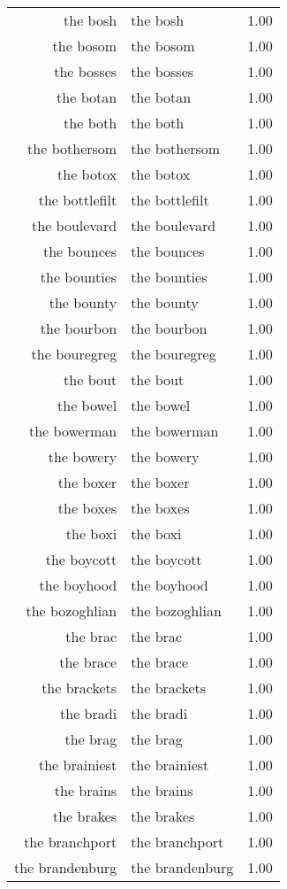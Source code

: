 \begin{table}[ht]
\begin{tabular}{rlr}
  the bosh & the bosh & 1.00 \\ 
  the bosom & the bosom & 1.00 \\ 
  the bosses & the bosses & 1.00 \\ 
  the botan & the botan & 1.00 \\ 
  the both & the both & 1.00 \\ 
  the bothersom & the bothersom & 1.00 \\ 
  the botox & the botox & 1.00 \\ 
  the bottlefilt & the bottlefilt & 1.00 \\ 
  the boulevard & the boulevard & 1.00 \\ 
  the bounces & the bounces & 1.00 \\ 
  the bounties & the bounties & 1.00 \\ 
  the bounty & the bounty & 1.00 \\ 
  the bourbon & the bourbon & 1.00 \\ 
  the bouregreg & the bouregreg & 1.00 \\ 
  the bout & the bout & 1.00 \\ 
  the bowel & the bowel & 1.00 \\ 
  the bowerman & the bowerman & 1.00 \\ 
  the bowery & the bowery & 1.00 \\ 
  the boxer & the boxer & 1.00 \\ 
  the boxes & the boxes & 1.00 \\ 
  the boxi & the boxi & 1.00 \\ 
  the boycott & the boycott & 1.00 \\ 
  the boyhood & the boyhood & 1.00 \\ 
  the bozoghlian & the bozoghlian & 1.00 \\ 
  the brac & the brac & 1.00 \\ 
  the brace & the brace & 1.00 \\ 
  the brackets & the brackets & 1.00 \\ 
  the bradi & the bradi & 1.00 \\ 
  the brag & the brag & 1.00 \\ 
  the brainiest & the brainiest & 1.00 \\ 
  the brains & the brains & 1.00 \\ 
  the brakes & the brakes & 1.00 \\ 
  the branchport & the branchport & 1.00 \\ 
  the brandenburg & the brandenburg & 1.00 \\ 

\end{tabular}
\end{table}
